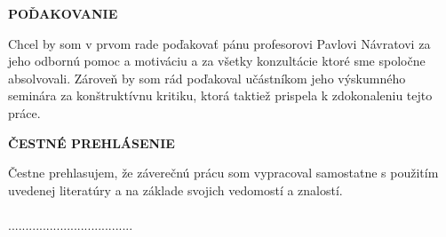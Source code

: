 \newpage\null\thispagestyle{empty}\newpage
\thispagestyle{plain}
\vspace*{15cm}
\begin{large}
\noindent
\textbf{POĎAKOVANIE} \\
\end{large}
\noindent
Chcel by som v prvom rade poďakovať pánu profesorovi Pavlovi Návratovi za jeho odbornú pomoc a motiváciu a za všetky konzultácie ktoré sme spoločne absolvovali. Zároveň by som rád poďakoval učástníkom jeho výskumného seminára za konštruktívnu kritiku, ktorá taktiež prispela k zdokonaleniu tejto práce.

\newpage\null\thispagestyle{empty}\newpage
\thispagestyle{plain}
\vspace*{15cm}
\begin{large}
\noindent
\textbf{ČESTNÉ PREHLÁSENIE} \\
\end{large}
\noindent
Čestne prehlasujem, že záverečnú prácu som vypracoval samostatne s použitím uvedenej literatúry a na základe svojich vedomostí a znalostí.
\\
\vspace*{0.5cm}\\
\hspace*{10cm}....................................\\
\hspace*{10.7cm} \Author
